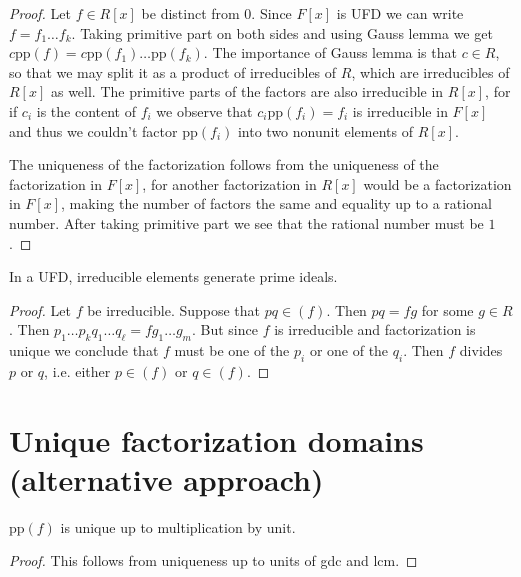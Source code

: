 \begin{proof}
Let $f\in R[x]$ be distinct from 0. Since $F[x]$ is UFD we can write
$f=f_1\ldots f_k$. Taking primitive part on both sides and using Gauss lemma we
get $c\text{pp}(f)=c \text{pp}(f_1)\ldots\text{pp}(f_k)$. The importance of
Gauss lemma is that $c \in R$, so that we may split it as a product of
irreducibles of $R$, which are irreducibles of $R[x]$ as well. The primitive
parts of the factors are also irreducible in $R[x]$, for if $c_i$ is the content
of $f_i$ we observe that $c_i\text{pp}(f_i)=f_i$ is irreducible in $F[x]$ and
thus we couldn't factor $\text{pp}(f_i)$ into two nonunit elements of $R[x]$.

The uniqueness of the factorization follows from the uniqueness of the
factorization in $F[x]$, for another factorization in $R[x]$ would be a
factorization in $F[x]$, making the number of factors the same and equality up
to a rational number. After taking primitive part we see that the rational
number must be $1$.
\end{proof}

\begin{lemma}
\label{lemma-in-UFD-irreducible-elements-generate-prime-ideals}
In a UFD, irreducible elements generate prime ideals.
\end{lemma}

\begin{proof}
Let $f$ be irreducible. Suppose that $pq\in(f)$. Then $pq=fg$ for some  $g\in
R$. Then $p_1\ldots p_kq_1\ldots q_\ell=fg_1\ldots g_m$. But since $f$ is
irreducible and factorization is unique we conclude that $f$ must be one of the
 $p_i$ or one of the $q_i$. Then $f$ divides $p$ or $q$, i.e. either $p\in(f)$
or $q\in(f)$.
\end{proof}

\section{Unique factorization domains (alternative approach)}
\label{section-UFD-alternative}


\begin{lemma}
\label{lemma-primitive-part-unique-up-to-unit}
$\text{pp}(f)$ is unique up to multiplication by unit.
\end{lemma}

\begin{proof}
This follows from uniqueness up to units of gdc and lcm.
\end{proof}

